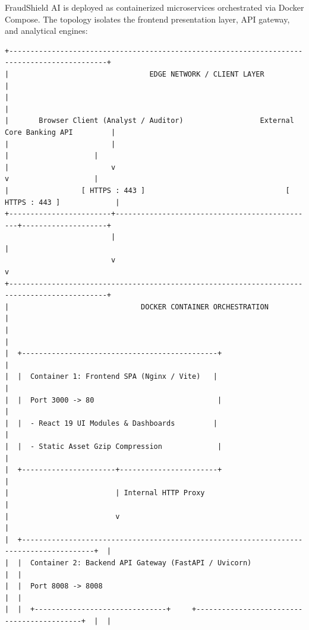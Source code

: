 \documentclass[12pt,a4paper,oneside]{report}
\begin{document}
FraudShield AI is deployed as containerized microservices orchestrated via Docker Compose. The topology isolates the frontend presentation layer, API gateway, and analytical engines:


\begin{lstlisting}
+---------------------------------------------------------------------------------------------+
|                                 EDGE NETWORK / CLIENT LAYER                                 |
|                                                                                             |
|       Browser Client (Analyst / Auditor)                  External Core Banking API         |
|                        |                                               |                    |
|                        v                                               v                    |
|                 [ HTTPS : 443 ]                                 [ HTTPS : 443 ]             |
+------------------------+-----------------------------------------------+--------------------+
                         |                                               |
                         v                                               v
+---------------------------------------------------------------------------------------------+
|                               DOCKER CONTAINER ORCHESTRATION                                |
|                                                                                             |
|  +----------------------------------------------+                                           |
|  |  Container 1: Frontend SPA (Nginx / Vite)   |                                           |
|  |  Port 3000 -> 80                             |                                           |
|  |  - React 19 UI Modules & Dashboards         |                                           |
|  |  - Static Asset Gzip Compression             |                                           |
|  +----------------------+-----------------------+                                           |
|                         | Internal HTTP Proxy                                               |
|                         v                                                                   |
|  +---------------------------------------------------------------------------------------+  |
|  |  Container 2: Backend API Gateway (FastAPI / Uvicorn)                                 |  |
|  |  Port 8008 -> 8008                                                                    |  |
|  |  +-------------------------------+     +-------------------------------------------+  |  |

\end{lstlisting}
\end{document}
